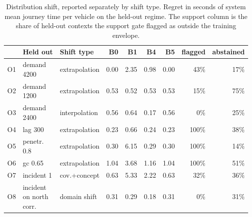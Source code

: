 \begin{table}[t]
\caption{Distribution shift, reported separately by shift type. Regret in
seconds of system mean journey time per vehicle on the held-out regime. The
support column is the share of held-out contexts the support gate flagged as
outside the training envelope.}
\label{tab:ood}
\centering\scriptsize
\setlength{\tabcolsep}{3pt}
\begin{tabular}{@{}l l l r r r r r r@{}}
\toprule
& Held out & Shift type & B0 & B1 & B4 & B5 & flagged & abstained\\
\midrule
O1 & demand 4200 & extrapolation & 0.00 & 2.35 & 0.98 & 0.00 & 43\% & 17\%\\
O2 & demand 1200 & extrapolation & 0.53 & 0.52 & 0.53 & 0.53 & 15\% & 75\%\\
O3 & demand 2400 & interpolation & 0.56 & 0.64 & 0.17 & 0.56 & 0\% & 25\%\\
O4 & lag 300 & extrapolation & 0.23 & 0.66 & 0.24 & 0.23 & 100\% & 38\%\\
O5 & penetr. 0.8 & extrapolation & 0.30 & 6.15 & 0.29 & 0.30 & 100\% & 14\%\\
O6 & gc 0.65 & extrapolation & 1.04 & 3.68 & 1.16 & 1.04 & 100\% & 51\%\\
O7 & incident 1 & cov.+concept & 0.63 & 5.33 & 2.22 & 0.63 & 32\% & 36\%\\
O8 & incident on north corr. & domain shift & 0.31 & 0.29 & 0.18 & 0.31 & 0\% & 31\%\\
\bottomrule
\end{tabular}
\end{table}
